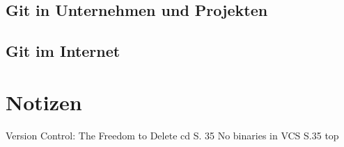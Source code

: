 \section{Git in Unternehmen und Projekten}
\section{Git im Internet}
\chapter{\result}\label{cha:result}

\chapter{Notizen}
Version Control: The Freedom to Delete cd S. 35
No binaries in VCS S.35 top
